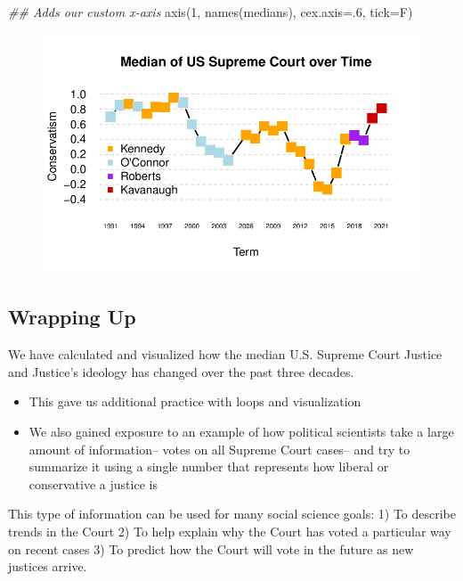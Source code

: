 \documentclass[
  letterpaper,
  DIV=11,
  numbers=noendperiod]{scrreprt}
\newenvironment{Shaded}{\begin{snugshade}}{\end{snugshade}}
\newcommand{\AttributeTok}[1]{\textcolor[rgb]{0.40,0.45,0.13}{#1}}
\newcommand{\DecValTok}[1]{\textcolor[rgb]{0.68,0.00,0.00}{#1}}
\newcommand{\DocumentationTok}[1]{\textcolor[rgb]{0.37,0.37,0.37}{\textit{#1}}}
\newcommand{\FunctionTok}[1]{\textcolor[rgb]{0.28,0.35,0.67}{#1}}
\newcommand{\NormalTok}[1]{\textcolor[rgb]{0.00,0.23,0.31}{#1}}
\providecommand{\tightlist}{%
  \setlength{\itemsep}{0pt}\setlength{\parskip}{0pt}}\usepackage{longtable,booktabs,array}
\begin{document}
\begin{Shaded}
\begin{Highlighting}[]
\DocumentationTok{\#\# Adds our custom x{-}axis}
\FunctionTok{axis}\NormalTok{(}\DecValTok{1}\NormalTok{, }\FunctionTok{names}\NormalTok{(medians), }\AttributeTok{cex.axis=}\NormalTok{.}\DecValTok{6}\NormalTok{, }\AttributeTok{tick=}\NormalTok{F)}
\end{Highlighting}
\end{Shaded}

\begin{figure}[H]

{\centering \includegraphics{06-Loops_files/figure-pdf/unnamed-chunk-35-1.pdf}

}

\end{figure}

\hypertarget{wrapping-up}{%
\subsection{Wrapping Up}\label{wrapping-up}}

We have calculated and visualized how the median U.S. Supreme Court
Justice and Justice's ideology has changed over the past three decades.

\begin{itemize}
\tightlist
\item
  This gave us additional practice with loops and visualization
\item
  We also gained exposure to an example of how political scientists take
  a large amount of information-- votes on all Supreme Court cases-- and
  try to summarize it using a single number that represents how liberal
  or conservative a justice is
\end{itemize}

This type of information can be used for many social science goals: 1)
To describe trends in the Court 2) To help explain why the Court has
voted a particular way on recent cases 3) To predict how the Court will
vote in the future as new justices arrive.
\end{document}
